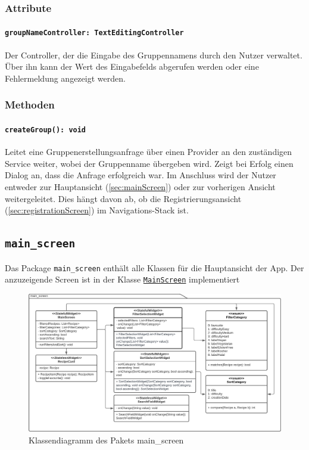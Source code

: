 \documentclass{entwurfsheft}
\begin{document}
\subsubsection*{Attribute}
\paragraph{\texttt{groupNameController: TextEditingController}}
Der Controller, der die Eingabe des Gruppennamens durch den Nutzer verwaltet. Über ihn kann der Wert des Eingabefelds abgerufen werden oder eine Fehlermeldung angezeigt werden.
\subsubsection*{Methoden}
\paragraph{\texttt{createGroup(): void}}
Leitet eine Gruppenerstellungsanfrage über einen Provider an den zuständigen Service weiter, wobei der Gruppenname übergeben wird. Zeigt bei Erfolg einen \Gls{Dialog} an, dass die Anfrage erfolgreich war. Im Anschluss wird der Nutzer entweder zur Hauptansicht (\ref{sec:mainScreen}) oder zur vorherigen Ansicht weitergeleitet. Dies hängt davon ab, ob die Registrierungsansicht (\ref{sec:registrationScreen}) im Navigations-Stack ist.
\newpage

\subsection{\texttt{main\_screen}}
Das Package \texttt{main\_screen} enthält alle Klassen für die Hauptansicht der App. Der anzuzeigende Screen ist in der Klasse \hyperref[sec:mainScreen]{\texttt{MainScreen}} implementiert
\begin{figure}
    [htp]
    \centering
    \includegraphics[width=\textwidth]{images/presentationLayer/classDiagrams/mainScreenWhole.pdf}
    \caption{Klassendiagramm des Pakets main\_screen}
\end{figure}
\newpage
\end{document}
